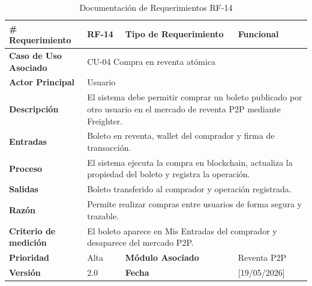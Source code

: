 \documentclass[12pt,letterpaper]{article}
\begin{document}
\begin{table}[H]
\centering
\scriptsize
\renewcommand{\arraystretch}{1.05}
\setlength{\tabcolsep}{3pt}

\newlength{\anchoceldaRFcatorce}
\setlength{\anchoceldaRFcatorce}{\dimexpr\textwidth-2.7cm-8\tabcolsep-5\arrayrulewidth\relax}

\begin{tabularx}{\textwidth}{|p{2.7cm}|X|p{2.8cm}|X|}
\hline
\textbf{\# Requerimiento} & RF-14 & \textbf{Tipo de Requerimiento} & Funcional \\ \hline

\textbf{Caso de Uso Asociado} & 
\multicolumn{3}{p{\anchoceldaRFcatorce}|}{CU-04 Compra en reventa atómica} \\ \hline

\textbf{Actor Principal} & 
\multicolumn{3}{p{\anchoceldaRFcatorce}|}{Usuario} \\ \hline

\textbf{Descripción} & 
\multicolumn{3}{p{\anchoceldaRFcatorce}|}{El sistema debe permitir comprar un boleto publicado por otro usuario en el mercado de reventa P2P mediante Freighter.} \\ \hline

\textbf{Entradas} & 
\multicolumn{3}{p{\anchoceldaRFcatorce}|}{Boleto en reventa, wallet del comprador y firma de transacción.} \\ \hline

\textbf{Proceso} & 
\multicolumn{3}{p{\anchoceldaRFcatorce}|}{El sistema ejecuta la compra en blockchain, actualiza la propiedad del boleto y registra la operación.} \\ \hline

\textbf{Salidas} & 
\multicolumn{3}{p{\anchoceldaRFcatorce}|}{Boleto transferido al comprador y operación registrada.} \\ \hline

\textbf{Razón} & 
\multicolumn{3}{p{\anchoceldaRFcatorce}|}{Permite realizar compras entre usuarios de forma segura y trazable.} \\ \hline

\textbf{Criterio de medición} & 
\multicolumn{3}{p{\anchoceldaRFcatorce}|}{El boleto aparece en Mis Entradas del comprador y desaparece del mercado P2P.} \\ \hline

\textbf{Prioridad} & Alta & \textbf{Módulo Asociado} & Reventa P2P \\ \hline

\textbf{Versión} & 2.0 & \textbf{Fecha} & [19/05/2026] \\ \hline

\end{tabularx}

\caption{Documentación de Requerimientos RF-14}
\label{tab:documentacion_requerimientos_rf14}
\normalsize
\end{table}
\end{document}
